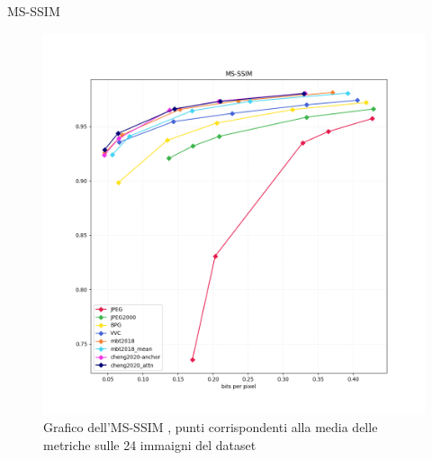     \begin{frame}{MS-SSIM}
        \begin{figure}[t!]
            \centering
            \includegraphics[width=0.65\textheight]{Immagini/METRICS/MS-SSIM.png}
            \caption{Grafico dell'MS-SSIM \cite{wang2003multiscale}, punti corrispondenti alla media delle metriche sulle 24 immaigni del dataset}
            \label{fig:GraphMS-SSIM}
        \end{figure}

    \end{frame}

